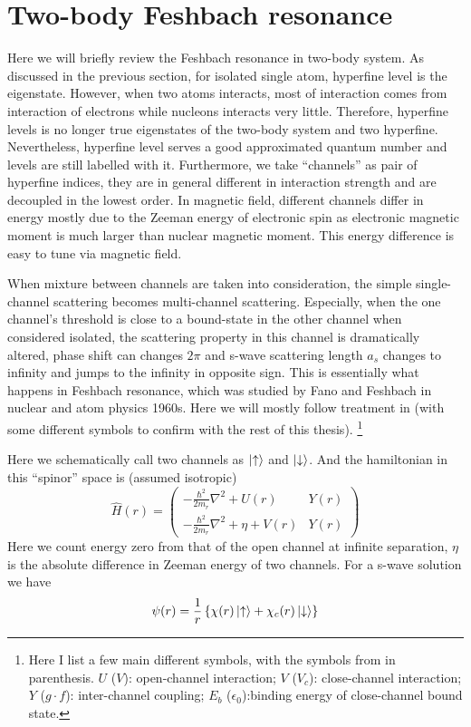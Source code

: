  
 \section{Two-body Feshbach resonance\label{sec:intro:twobody}}
Here we will briefly review the Feshbach resonance in two-body system.   As discussed in the previous section, for isolated single atom, hyperfine level is the eigenstate.  However, when two atoms interacts, most of interaction comes from interaction of electrons while nucleons interacts very little.  Therefore, hyperfine levels is no longer true eigenstates of the two-body system and two hyperfine.  Nevertheless, hyperfine level serves a good approximated quantum number and levels are still labelled with it. Furthermore, we take ``channels'' as pair of hyperfine indices, they are in general different in interaction strength and are decoupled in the lowest order.  In magnetic field, different channels differ in energy mostly due to the Zeeman energy of electronic spin as electronic magnetic moment is much larger than nuclear magnetic moment.  This energy difference is easy to tune via magnetic field.  

When mixture between channels are taken into consideration, the simple single-channel scattering becomes multi-channel scattering.  Especially, when the one channel's threshold is close to a bound-state in the other channel when considered isolated, the scattering property in this channel is dramatically altered,  phase shift can changes $2\pi$ and s-wave scattering length $a_{s}$ changes to infinity and jumps to the infinity in opposite sign.  This is essentially what happens in Feshbach resonance, which was studied by Fano\cite{Fano} and Feshbach \cite{nuclear}  in nuclear and atom physics 1960s.  Here we will mostly follow treatment in \cite{Leggett} (with some different symbols to confirm with the rest of this thesis). 
\footnote{Here I list a few main different symbols, with the symbols from \cite{Leggett} in parenthesis.  $U$ ($V$): open-channel interaction; $V$ ($V_{c}$): close-channel interaction; $Y$ ($g\cdot{}f$): inter-channel coupling; $E_{b}$ ($\epsilon_{0}$):binding energy of close-channel bound state.}

Here we schematically call two channels as $\left|\uparrow\right>$ and $\left|\downarrow\right>$.  And the hamiltonian in this ``spinor'' space is (assumed isotropic)
\begin{equation}
\hat{H}(r)=
\begin{pmatrix}
-\frac{\hbar^{2}}{2m_{r}}\nabla^{2}+U(r)&Y(r)\\
-\frac{\hbar^{2}}{2m_{r}}\nabla^{2}+\eta+V(r)&Y(r)
\end{pmatrix}
\end{equation}
Here we count energy zero from that of the open channel at infinite separation, $\eta$ is the absolute difference in Zeeman energy of two channels.  For a s-wave solution we have 
\begin{equation}
\psi(r)=\frac{1}{r}\left\{\chi(r)\left|\uparrow\right>+\chi_{c}(r)\left|\downarrow\right>\right\}
\end{equation}


